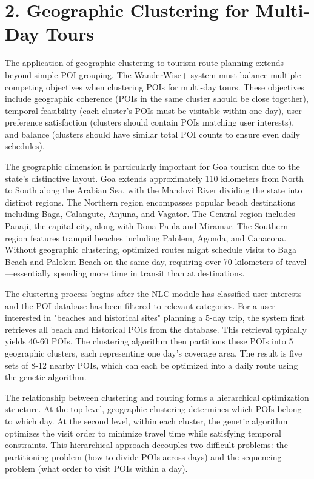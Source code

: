 \section{2. Geographic Clustering for Multi-Day Tours}

The application of geographic clustering to tourism route planning extends beyond simple POI grouping. The WanderWise+ system must balance multiple competing objectives when clustering POIs for multi-day tours. These objectives include geographic coherence (POIs in the same cluster should be close together), temporal feasibility (each cluster's POIs must be visitable within one day), user preference satisfaction (clusters should contain POIs matching user interests), and balance (clusters should have similar total POI counts to ensure even daily schedules).

The geographic dimension is particularly important for Goa tourism due to the state's distinctive layout. Goa extends approximately 110 kilometers from North to South along the Arabian Sea, with the Mandovi River dividing the state into distinct regions. The Northern region encompasses popular beach destinations including Baga, Calangute, Anjuna, and Vagator. The Central region includes Panaji, the capital city, along with Dona Paula and Miramar. The Southern region features tranquil beaches including Palolem, Agonda, and Canacona. Without geographic clustering, optimized routes might schedule visits to Baga Beach and Palolem Beach on the same day, requiring over 70 kilometers of travel—essentially spending more time in transit than at destinations.

The clustering process begins after the NLC module has classified user interests and the POI database has been filtered to relevant categories. For a user interested in "beaches and historical sites" planning a 5-day trip, the system first retrieves all beach and historical POIs from the database. This retrieval typically yields 40-60 POIs. The clustering algorithm then partitions these POIs into 5 geographic clusters, each representing one day's coverage area. The result is five sets of 8-12 nearby POIs, which can each be optimized into a daily route using the genetic algorithm.

The relationship between clustering and routing forms a hierarchical optimization structure. At the top level, geographic clustering determines which POIs belong to which day. At the second level, within each cluster, the genetic algorithm optimizes the visit order to minimize travel time while satisfying temporal constraints. This hierarchical approach decouples two difficult problems: the partitioning problem (how to divide POIs across days) and the sequencing problem (what order to visit POIs within a day).

